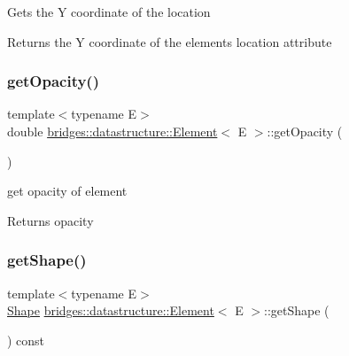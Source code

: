 Gets the Y coordinate of the location \begin{DoxyReturn}{Returns}
the Y coordinate of the element\textquotesingle{}s location attribute 
\end{DoxyReturn}
\mbox{\label{classbridges_1_1datastructure_1_1_element_acf14bfc12da42565b237a7bd79bd36c2}} 
\subsubsection{\texorpdfstring{get\+Opacity()}{getOpacity()}}
{\footnotesize\ttfamily template$<$typename E$>$ \\
double \hyperlink{classbridges_1_1datastructure_1_1_element}{bridges\+::datastructure\+::\+Element}$<$ E $>$\+::get\+Opacity (\begin{DoxyParamCaption}{ }\end{DoxyParamCaption})\hspace{0.3cm}{\ttfamily [inline]}}

get opacity of element

\begin{DoxyReturn}{Returns}
opacity 
\end{DoxyReturn}
\mbox{\label{classbridges_1_1datastructure_1_1_element_acb8680aa406733d36411fd189017706c}} 
\subsubsection{\texorpdfstring{get\+Shape()}{getShape()}}
{\footnotesize\ttfamily template$<$typename E$>$ \\
\hyperlink{namespacebridges_1_1datastructure_a3408f5f44d9c6062e5f3adb7e1bbb7f0}{Shape} \hyperlink{classbridges_1_1datastructure_1_1_element}{bridges\+::datastructure\+::\+Element}$<$ E $>$\+::get\+Shape (\begin{DoxyParamCaption}{ }\end{DoxyParamCaption}) const\hspace{0.3cm}{\ttfamily [inline]}}




